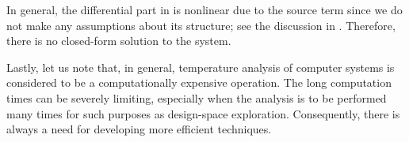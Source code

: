 In general, the differential part in  is
nonlinear due to the source term \vp since we do not make any assumptions about
its structure; see the discussion in . Therefore, there is no
closed-form solution to the system.

Lastly, let us note that, in general, temperature analysis of computer systems
is considered to be a computationally expensive operation. The long computation
times can be severely limiting, especially when the analysis is to be performed
many times for such purposes as design-space exploration. Consequently, there is
always a need for developing more efficient techniques.
